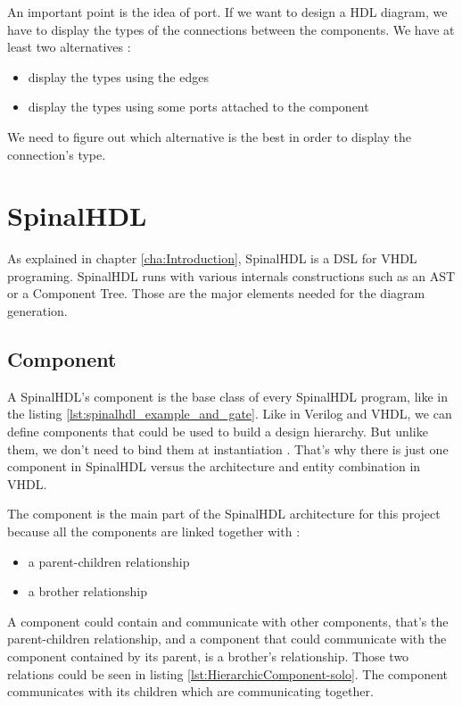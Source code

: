 An important point is the idea of port. If we want to design a HDL diagram, we
have to display the types of the connections between the components. We have at
least two alternatives :
\begin{itemize}
 \item display the types using the edges
 \item display the types using some ports attached to the component
\end{itemize}

We need to figure out which alternative is the best in order to display the
connection's type.

\section{SpinalHDL}
\label{sec:SpinalHDL}

As explained in chapter \ref{cha:Introduction}, SpinalHDL is a DSL for VHDL
programing. SpinalHDL runs with various internals constructions such as an AST or
a Component Tree. Those are the major elements needed for the diagram generation.

\subsection{Component}
\label{sub:Component}

A SpinalHDL's component is the base class of every SpinalHDL program, like in
the listing \ref{lst:spinalhdl_example_and_gate}. Like in Verilog and VHDL, we
can define components that could be used to build a design hierarchy. But unlike
them, we don’t need to bind them at instantiation \cite{github-spinalhdl}.
That's why there is just one component in SpinalHDL versus the architecture and entity
combination in VHDL.

The component is the main part of the SpinalHDL architecture for this project
because all the components are linked together with :
\begin{itemize}
    \item a parent-children relationship
    \item a brother relationship
\end{itemize}

A component could contain and communicate with other components, that's the
parent-children relationship, and a component that could communicate with the
component contained by its parent, is a brother's relationship. Those two
relations could be seen in listing \ref{lst:HierarchicComponent-solo}. The
component communicates with its children which are communicating together.

